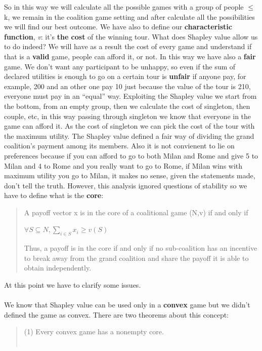\documentclass{article}
\begin{document}
{So in this way we will calculate all the possible games with a group of people $\le$ k, we remain in the coalition game setting and after calculate all the possibilities we will find our best outcome. We have also to define our \textbf{characteristic function}, \textit{v}: it's \textbf{the cost} of the winning tour. What does Shapley value allow us to do indeed? We will have as a result the cost of every game and understand if that is a \textbf{valid} game, people can afford it, or not. In this way we have also a \textbf{fair} game. We don't want any participant to be unhappy, so even if the sum of declared utilities is enough to go on a certain tour is \textbf{unfair} if anyone pay, for example, 200 and an other one pay 10 just because the value of the tour is 210, everyone must pay in an  “equal” way. Exploiting the Shapley value we start from the bottom, from an empty group, then we calculate the cost of singleton, then couple, etc, in this way passing through singleton we know that everyone in the game can afford it. As the cost of singleton we can pick the cost of the tour with the maximum utility. The Shapley value defined a fair way of dividing the grand coalition’s payment among its members. Also it is not convienent to lie on preferences because if you can afford to go to both Milan and Rome and give 5 to Milan and 4 to Rome and you really want to go to Rome, if Milan wins with maximum utility you go to Milan, it makes no sense, given the statements made, don't tell the truth. However, this analysis ignored questions of stability so we have to define what is the \textbf{core}:
\begin{quote}
    A payoff vector x is in the core of a coalitional game (N,v) if and only if
    \begin{center}
        $\forall S \subseteq N, \displaystyle \sum_{i \in S} x_i \ge v(S)$
    \end{center}
    Thus, a payoff is in the core if and only if no sub-coalition has an incentive to break away from the grand coalition and share the payoff it is able to obtain independently.\\
\end{quote}
At this point we have to clarify some issues.\\\\
We know that Shapley value can be used only in a \textbf{convex} game but we didn't defined the game as convex. There are two theorems about this concept:
\begin{quote}
    (1) Every convex game has a nonempty core.\\\\

\end{quote}}
\end{document}

